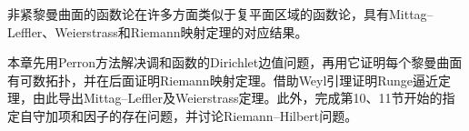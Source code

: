 非紧黎曼曲面的函数论在许多方面类似于复平面区域的函数论，具有Mittag--Leffler、Weierstrass和Riemann映射定理的对应结果。

本章先用Perron方法解决调和函数的Dirichlet边值问题，再用它证明每个黎曼曲面有可数拓扑，并在后面证明Riemann映射定理。借助Weyl引理证明Runge逼近定理，由此导出Mittag--Leffler及Weierstrass定理。此外，完成第10、11节开始的指定自守加项和因子的存在问题，并讨论Riemann--Hilbert问题。
